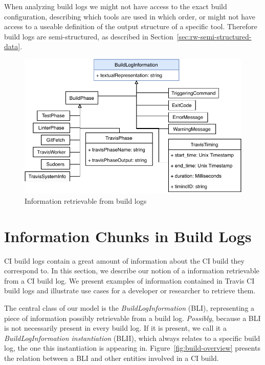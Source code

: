 \documentclass[\myrootdir/main.tex]{subfiles}
\begin{document}
When analyzing build logs we might not have access to the exact build configuration, describing which tools are used in which order, or might not have access to a useable definition of the output structure of a specific tool.
Therefore build logs are semi-structured, as described in Section~\ref{sec:rw-semi-structured-data}.


\begin{figure}[htbp]
	\centering
	\includegraphics[width=\textwidth, clip]{img/build-log-information.pdf}
	\caption{Information retrievable from build logs}
	\label{fig:build-log-information}
\end{figure}

\section{Information Chunks in Build Logs}
\label{sec:bli}
CI build logs contain a great amount of information about the CI build they correspond to.
In this section, we describe our notion of a information retrievable from a CI build log.
We present examples of information contained in Travis CI build logs and illustrate use cases for a developer or researcher to retrieve them.

The central class of our model is the \emph{BuildLogInformation} (BLI), representing a piece of information possibly retrievable from a build log.
\emph{Possibly}, because a BLI is not necessarily present in every build log.
If it is present, we call it a \emph{BuildLogInformation instantiation} (BLII), which always relates to a specific build log, the one this instantiation is appearing in.
Figure~\ref{fig:build-overview} presents the relation between a BLI and other entities involved in a CI build.
\end{document}
